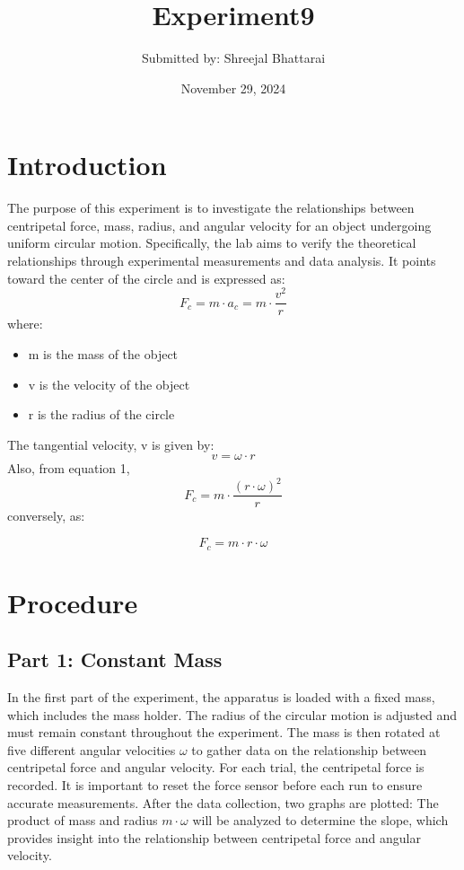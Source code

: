 \documentclass{report}
\title{ \Huge Experiment9}
\author{ \Large Submitted by: Shreejal Bhattarai}
\date{November 29, 2024}
\begin{document}
\maketitle

\section{Introduction}
The purpose of this experiment is to investigate the relationships between centripetal force, mass, radius, and angular velocity for an object undergoing uniform circular motion. Specifically, the lab aims to verify the theoretical relationships through experimental measurements and data analysis. It points toward the center of the circle and is expressed as:
\begin{equation}
  { F_{c} = m \cdot a_{c} = m \cdot {\frac{v^2}{r}}}
\end{equation}
where:
\begin{itemize}
    \item m is the mass of the object
    \item v is the velocity of the object
    \item r is the radius of the circle
\end{itemize}

The tangential velocity, v is given by:
\[
v = \omega \cdot r
\]
Also, from equation 1,
\[
F_{c} = m \cdot \frac{(r \cdot \omega)^2}{r}
\]
conversely, as:

\begin{equation}
    F_{c} = m \cdot r \cdot \omega
\end{equation}

\newpage
\section{Procedure}

\subsection{Part 1: Constant Mass}
In the first part of the experiment, the apparatus is loaded with a fixed mass, which includes the mass holder. The radius of the circular motion is adjusted and must remain constant throughout the experiment. The mass is then rotated at five different angular velocities \( \omega \) to gather data on the relationship between centripetal force and angular velocity. For each trial, the centripetal force is recorded. It is important to reset the force sensor before each run to ensure accurate measurements. After the data collection, two graphs are plotted: 
The product of mass and radius \( m \cdot \omega \) will be analyzed to determine the slope, which provides insight into the relationship between centripetal force and angular velocity.
\end{document}
